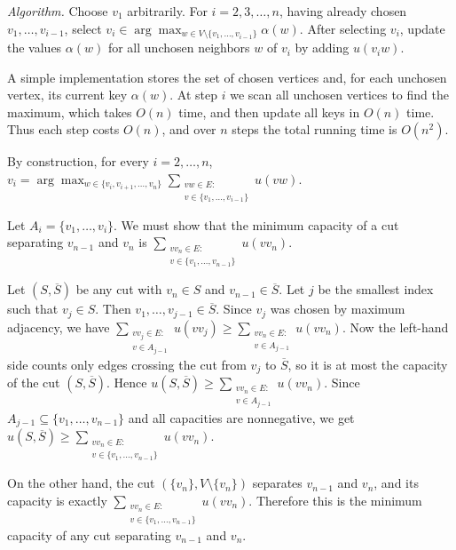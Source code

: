 \documentclass[letterpaper]{article}
\begin{document}
		\medskip
		
		\textit{Algorithm.}
		Choose $v_1$ arbitrarily. For $i=2,3,\ldots,n$, having already chosen
		$v_1,\ldots,v_{i-1}$, select
		$
		v_i \in \arg\max_{w \in V \setminus \{v_1,\ldots,v_{i-1}\}} \alpha(w).
		$
		After selecting $v_i$, update the values $\alpha(w)$ for all unchosen neighbors
		$w$ of $v_i$ by adding $u(v_iw)$.
		
		\medskip
		
		A simple implementation stores the set of chosen vertices and, for each unchosen
		vertex, its current key $\alpha(w)$. At step $i$ we scan all unchosen vertices to
		find the maximum, which takes $O(n)$ time, and then update all keys in $O(n)$ time.
		Thus each step costs $O(n)$, and over $n$ steps the total running time is $O(n^2).$
		
		By construction, for every $i=2,\ldots,n$,
		$
		v_i
		=
		\arg\max_{w \in \{v_i,v_{i+1},\ldots,v_n\}}
		\sum_{\substack{vw \in E:\\ v \in \{v_1,\ldots,v_{i-1}\}}} u(vw).
		$
		
		\medskip
		
		\item[(b)] Let
		$
		A_i = \{v_1,\ldots,v_i\}.
		$
		We must show that the minimum capacity of a cut separating $v_{n-1}$ and $v_n$ is
		$
		\sum_{\substack{v v_n \in E:\\ v \in \{v_1,\ldots,v_{n-1}\}}} u(vv_n).
		$
		
		Let $(S,\overline S)$ be any cut with $v_n \in S$ and $v_{n-1} \in \overline S$.
		Let $j$ be the smallest index such that $v_j \in S$. Then
		$
		v_1,\ldots,v_{j-1} \in \overline S.
		$
		Since $v_j$ was chosen by maximum adjacency, we have
		$
		\sum_{\substack{v v_j \in E:\\ v \in A_{j-1}}} u(vv_j)
		\ge
		\sum_{\substack{v v_n \in E:\\ v \in A_{j-1}}} u(vv_n).
		$
		Now the left-hand side counts only edges crossing the cut from $v_j$ to
		$\overline S$, so it is at most the capacity of the cut $(S,\overline S)$.
		Hence
		$
		u(S,\overline S)
		\ge
		\sum_{\substack{v v_n \in E:\\ v \in A_{j-1}}} u(vv_n).
		$
		Since $A_{j-1} \subseteq \{v_1,\ldots,v_{n-1}\}$ and all capacities are nonnegative,
		we get
		$
		u(S,\overline S)
		\ge
		\sum_{\substack{v v_n \in E:\\ v \in \{v_1,\ldots,v_{n-1}\}}} u(vv_n).
		$
		
		On the other hand, the cut
		$
		(\{v_n\}, V \setminus \{v_n\})
		$
		separates $v_{n-1}$ and $v_n$, and its capacity is exactly
		$
		\sum_{\substack{v v_n \in E:\\ v \in \{v_1,\ldots,v_{n-1}\}}} u(vv_n).
		$
		Therefore this is the minimum capacity of any cut separating $v_{n-1}$ and $v_n$.
		
\end{document}
